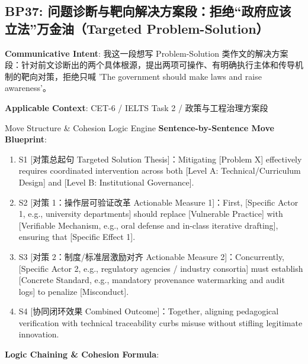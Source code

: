 \subsection{BP37: 问题诊断与靶向解决方案段：拒绝“政府应该立法”万金油（Targeted Problem-Solution）}\label{sec:bp:BP37}
\noindent\textbf{\color{AcadNavy}Communicative Intent}: 我这一段想写 Problem-Solution 类作文的解决方案段：针对前文诊断出的两个具体根源，提出两项可操作、有明确执行主体和传导机制的靶向对策，拒绝只喊 'The government should make laws and raise awareness'。\par\vspace{2pt}
\noindent\textbf{\color{AcadSlate}Applicable Context}: CET-6 / IELTS Task 2 / 政策与工程治理方案段\par\vspace{4pt}
\begin{ConceptBox}{Move Structure \& Cohesion Logic Engine}
\textbf{Sentence-by-Sentence Move Blueprint}:
\begin{enumerate}[label=\textbf{\color{AcadNavy}S\arabic*.}, leftmargin=2em, itemsep=2pt]
  \item S1 [对策总起句 Targeted Solution Thesis]：Mitigating [Problem X] effectively requires coordinated intervention across both [Level A: Technical/Curriculum Design] and [Level B: Institutional Governance].
  \item S2 [对策 1：操作层可验证改革 Actionable Measure 1]：First, [Specific Actor 1, e.g., university departments] should replace [Vulnerable Practice] with [Verifiable Mechanism, e.g., oral defense and in-class iterative drafting], ensuring that [Specific Effect 1].
  \item S3 [对策 2：制度/标准层激励对齐 Actionable Measure 2]：Concurrently, [Specific Actor 2, e.g., regulatory agencies / industry consortia] must establish [Concrete Standard, e.g., mandatory provenance watermarking and audit logs] to penalize [Misconduct].
  \item S4 [协同闭环效果 Combined Outcome]：Together, aligning pedagogical verification with technical traceability curbs misuse without stifling legitimate innovation.
\end{enumerate}\par\vspace{4pt}
\textbf{Logic Chaining \& Cohesion Formula}:\par{}
\end{ConceptBox}

